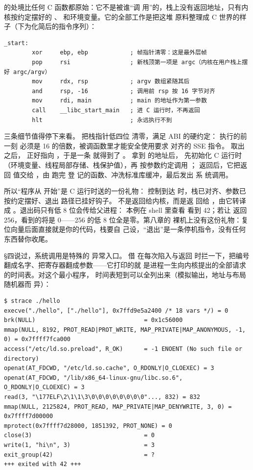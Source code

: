  的处境比任何 C 函数都原始：它不是被谁“调
用”的，栈上没有返回地址，只有内核按约定摆好的
、 和环境变量。它的全部工作是把这堆
原料整理成 C 世界的样子（下为化简后的指令序列）：

\begin{lstlisting}
_start:
        xor     ebp, ebp            ; 帧指针清零：这是最外层帧
        pop     rsi                 ; 新栈顶第一项是 argc（内核在用户栈上摆好 argc/argv）
        mov     rdx, rsp            ; argv 数组紧随其后
        and     rsp, -16            ; 调用前 rsp 按 16 字节对齐
        mov     rdi, main           ; main 的地址作为第一参数
        call    __libc_start_main   ; 进 C 运行时，不再返回
        hlt                         ; 永远执行不到
\end{lstlisting}

三条细节值得停下来看。 把栈指针低四位
清零，满足 ABI 的硬约定： 执行的前一刻
 必须是 16 的倍数，被调函数里才能安全使用要求
对齐的 SSE 指令。 取出  之后，
 正好指向 ，于是一条
 就得到了 。
 拿到  的地址后，
先初始化 C 运行时（环境变量、线程局部存储、栈保护值），再
按参数约定调用 ； 返回后，它把返回
值交给 ，由  跑完  登
记的函数、冲洗标准库缓冲，最后发出  系
统调用。

所以“程序从  开始”是 C 运行时送的一份礼物：
控制到达  时，栈已对齐、参数已按约定摆好、退出
路径已挂好钩子。 不是返回给内核，而是返
回给 ，由它转译成
。退出码只有低 8 位会传给父进程：
本例在 shell 里查看  看到 42；若让 
返回 256，看到的将是 0——256 的低 8 位全是零。第八章的
裸机上没有这份礼物：复位向量后面直接就是你的代码，栈要自
己设，“退出”是一条停机指令，没有任何东西替你收尾。

§四说过，系统调用是特殊的
异常入口。 借  在每次陷入与返回
时拦一下，把编号翻成名字、把寄存器翻成参数——它打印的就
是进程一生向内核提出的全部请求的时间表。对这个最小程序，
时间表短到可以全列出来（模拟输出，地址与布局随机器而
异）：

\begin{lstlisting}
$ strace ./hello
execve("./hello", ["./hello"], 0x7ffd9e5a2400 /* 18 vars */) = 0
brk(NULL)                               = 0x1c56000
mmap(NULL, 8192, PROT_READ|PROT_WRITE, MAP_PRIVATE|MAP_ANONYMOUS, -1, 0) = 0x7ffff7fca000
access("/etc/ld.so.preload", R_OK)      = -1 ENOENT (No such file or directory)
openat(AT_FDCWD, "/etc/ld.so.cache", O_RDONLY|O_CLOEXEC) = 3
openat(AT_FDCWD, "/lib/x86_64-linux-gnu/libc.so.6", O_RDONLY|O_CLOEXEC) = 3
read(3, "\177ELF\2\1\1\3\0\0\0\0\0\0\0\0"..., 832) = 832
mmap(NULL, 2125824, PROT_READ, MAP_PRIVATE|MAP_DENYWRITE, 3, 0) = 0x7ffff7d00000
mprotect(0x7ffff7d28000, 1851392, PROT_NONE) = 0
close(3)                                = 0
write(1, "hi\n", 3)                     = 3
exit_group(42)                          = ?
+++ exited with 42 +++
\end{lstlisting}

